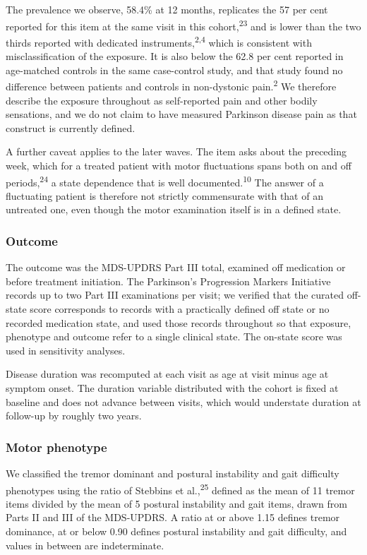 \documentclass[
  english,
  12pt,
]{article}
\begin{document}
The prevalence we observe, 58.4\% at 12 months, replicates the 57 per cent reported for this item at the same visit in this cohort,\textsuperscript{23} and is lower than the two thirds reported with dedicated instruments,\textsuperscript{2,4} which is consistent with misclassification of the exposure. It is also below the 62.8 per cent reported in age-matched controls in the same case-control study, and that study found no difference between patients and controls in non-dystonic pain.\textsuperscript{2} We therefore describe the exposure throughout as self-reported pain and other bodily sensations, and we do not claim to have measured Parkinson disease pain as that construct is currently defined.

A further caveat applies to the later waves. The item asks about the preceding week, which for a treated patient with motor fluctuations spans both on and off periods,\textsuperscript{24} a state dependence that is well documented.\textsuperscript{10} The answer of a fluctuating patient is therefore not strictly commensurate with that of an untreated one, even though the motor examination itself is in a defined state.

\subsubsection{Outcome}\label{outcome}

The outcome was the MDS-UPDRS Part III total, examined off medication or before treatment initiation. The Parkinson's Progression Markers Initiative records up to two Part III examinations per visit; we verified that the curated off-state score corresponds to records with a practically defined off state or no recorded medication state, and used those records throughout so that exposure, phenotype and outcome refer to a single clinical state. The on-state score was used in sensitivity analyses.

Disease duration was recomputed at each visit as age at visit minus age at symptom onset. The duration variable distributed with the cohort is fixed at baseline and does not advance between visits, which would understate duration at follow-up by roughly two years.

\subsubsection{Motor phenotype}\label{motor-phenotype}

We classified the tremor dominant and postural instability and gait difficulty phenotypes using the ratio of Stebbins et al.,\textsuperscript{25} defined as the mean of 11 tremor items divided by the mean of 5 postural instability and gait items, drawn from Parts II and III of the MDS-UPDRS. A ratio at or above 1.15 defines tremor dominance, at or below 0.90 defines postural instability and gait difficulty, and values in between are indeterminate.
\end{document}
